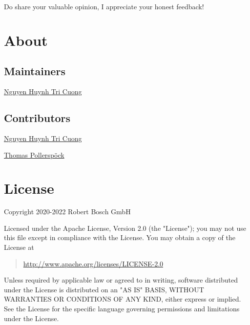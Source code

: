 Do share your valuable opinion, I appreciate your honest feedback!

\hypertarget{description-about}{%
\section{About}\label{description-about}}

\hypertarget{description-maintainers}{%
\subsection{Maintainers}\label{description-maintainers}}

\href{mailto:Cuong.NguyenHuynhTri@vn.bosch.com}{Nguyen Huynh Tri Cuong}

\hypertarget{description-contributors}{%
\subsection{Contributors}\label{description-contributors}}

\href{mailto:Cuong.NguyenHuynhTri@vn.bosch.com}{Nguyen Huynh Tri Cuong}

\href{mailto:Thomas.Pollerspoeck@de.bosch.com}{Thomas Pollerspöck}

\hypertarget{description-license}{%
\section{License}\label{description-license}}

Copyright 2020-2022 Robert Bosch GmbH

Licensed under the Apache License, Version 2.0 (the "License"); you may
not use this file except in compliance with the License. You may obtain
a copy of the License at

\begin{quote}
\url{http://www.apache.org/licenses/LICENSE-2.0}
\end{quote}

Unless required by applicable law or agreed to in writing, software
distributed under the License is distributed on an "AS IS" BASIS,
WITHOUT WARRANTIES OR CONDITIONS OF ANY KIND, either express or implied.
See the License for the specific language governing permissions and
limitations under the License.
